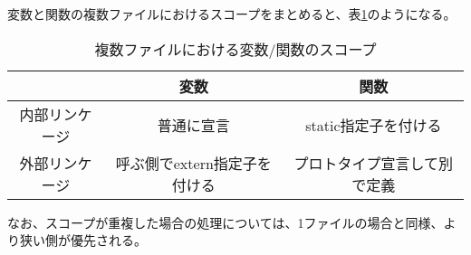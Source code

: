 変数と関数の複数ファイルにおけるスコープをまとめると、表\ref{chap6_tab_scope}のようになる。
\begin{table}[htbp]
\centering
\caption{複数ファイルにおける変数/関数のスコープ}\label{chap6_tab_scope}
\begin{tabular}{|c|c|c|}\hline
 &変数&関数\\ \hline
内部リンケージ&普通に宣言&static指定子を付ける\\ \hline
外部リンケージ&呼ぶ側でextern指定子を付ける&プロトタイプ宣言して別で定義\\ \hline
\end{tabular}
\end{table}

なお、スコープが重複した場合の処理については、1ファイルの場合と同様、より狭い側が優先される。
\newpage

